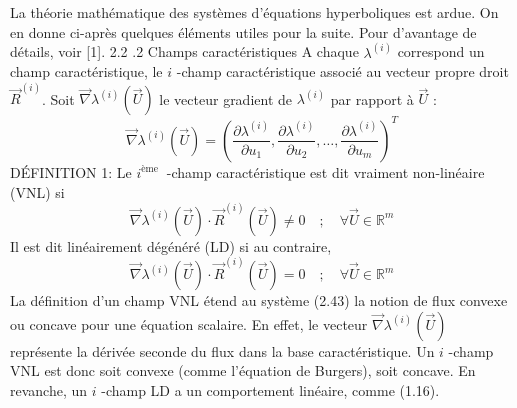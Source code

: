 La théorie mathématique des systèmes d'équations hyperboliques est ardue. On en donne ci-après quelques éléments utiles pour la suite. Pour d'avantage de détails, voir [1].
2.2 .2 Champs caractéristiques
A chaque $\lambda^{(i)}$ correspond un champ caractéristique, le $i$ -champ caractéristique associé au vecteur propre droit $\vec{R}^{(i)}$. Soit $\vec{\nabla} \lambda^{(i)}(\vec{U})$ le vecteur gradient de $\lambda^{(i)}$ par rapport à $\vec{U}$ :
$$
\vec{\nabla} \lambda^{(i)}(\vec{U})=\left(\frac{\partial \lambda^{(i)}}{\partial u_{1}}, \frac{\partial \lambda^{(i)}}{\partial u_{2}}, \ldots, \frac{\partial \lambda^{(i)}}{\partial u_{m}}\right)^{T}
$$
DÉFINITION 1: Le $i^{\text {ème }}$ -champ caractéristique est dit vraiment non-linéaire (VNL) si
$$
\vec{\nabla} \lambda^{(i)}(\vec{U}) \cdot \vec{R}^{(i)}(\vec{U}) \neq 0 \quad ; \quad \forall \vec{U} \in \mathbb{R}^{m}
$$
Il est dit linéairement dégénéré (LD) si au contraire,
$$
\vec{\nabla} \lambda^{(i)}(\vec{U}) \cdot \vec{R}^{(i)}(\vec{U})=0 \quad ; \quad \forall \vec{U} \in \mathbb{R}^{m}
$$
La définition d'un champ VNL étend au système (2.43) la notion de flux convexe ou concave pour une équation scalaire. En effet, le vecteur $\vec{\nabla} \lambda^{(i)}(\vec{U})$ représente la dérivée seconde du flux dans la base caractéristique. Un $i$ -champ VNL est donc soit convexe (comme l'équation de Burgers), soit concave. En revanche, un $i$ -champ LD a un comportement linéaire, comme (1.16).
